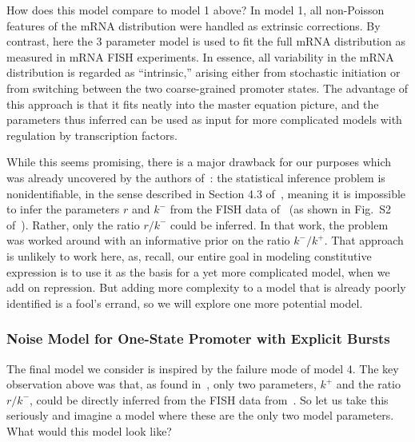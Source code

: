 How does this model compare to model 1 above? In model 1, all non-Poisson
features of the mRNA distribution were handled as extrinsic corrections. By
contrast, here the 3 parameter model is used to fit the full mRNA distribution
as measured in mRNA FISH experiments. In essence, all variability in the mRNA
distribution is regarded as ``intrinsic,'' arising either from stochastic
initiation or from switching between the two coarse-grained promoter states. The
advantage of this approach is that it fits neatly into the master equation
picture, and the parameters thus inferred can be used as input for more
complicated models with regulation by transcription factors.

While this seems promising, there is a major drawback for our purposes which was
already uncovered by the authors of~\cite{Razo-Mejia2020}: the statistical
inference problem is nonidentifiable, in the sense described in Section 4.3
of~\cite{Gelman2013}, meaning it is impossible to infer the parameters $r$ and
$k^-$ from the FISH data of~\cite{Jones2014} (as shown in Fig.~S2
of~\cite{Razo-Mejia2020}). Rather, only the ratio $r/k^-$ could be inferred. In
that work, the problem was worked around with an informative prior on the ratio
$k^-/k^+$. That approach is unlikely to work here, as, recall, our entire goal
in modeling constitutive expression is to use it as the basis for a yet more
complicated model, when we add on repression. But adding more complexity to a
model that is already poorly identified is a fool's errand, so we will explore
one more potential model.


\subsubsection{Noise Model for One-State Promoter with Explicit Bursts}
The final model we consider is 
 inspired by the failure mode of model 4. The key observation above
was that, as found in~\cite{Razo-Mejia2020}, only two parameters, $k^+$ and the
ratio $r/k^-$, could be directly inferred from the FISH data
from~\cite{Jones2014}. So let us take this seriously and imagine a model where
these are the only two model parameters. What would this model look like?

